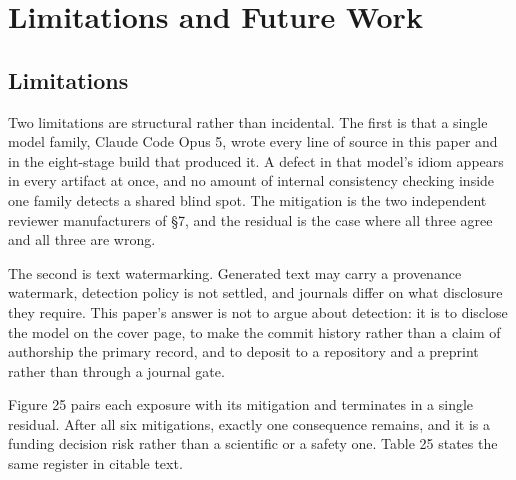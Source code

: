 \section{Limitations and Future Work}
\label{sec:limitations}

\subsection{Limitations}

Two limitations are structural rather than incidental. The first is that a
single model family, Claude Code Opus 5, wrote every line of source in this
paper and in the eight-stage build that produced it. A defect in that model's
idiom appears in every artifact at once, and no amount of internal consistency
checking inside one family detects a shared blind spot. The mitigation is the
two independent reviewer manufacturers of \S7, and the residual is the case
where all three agree and all three are wrong.


The second is text watermarking. Generated text may carry a provenance
watermark, detection policy is not settled, and journals differ on what
disclosure they require. This paper's answer is not to argue about detection: it
is to disclose the model on the cover page, to make the commit history rather
than a claim of authorship the primary record, and to deposit to a repository
and a preprint rather than through a journal gate.


Figure 25 pairs each exposure with its mitigation and terminates in a single
residual. After all six mitigations, exactly one consequence remains, and it is
a funding decision risk rather than a scientific or a safety one. Table 25
states the same register in citable text.

